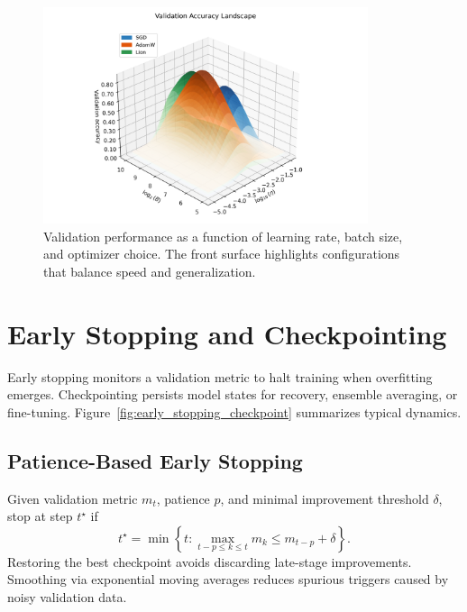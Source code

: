 \documentclass{article}
\begin{document}
\begin{figure}[H]
  \centering
  \includegraphics[width=0.85\textwidth]{hyperparameter_landscape.png}
  \caption{Validation performance as a function of learning rate, batch size, and optimizer choice. The front surface highlights configurations that balance speed and generalization.}
  \label{fig:hyperparameter_landscape}
\end{figure}
\FloatBarrier

\section{Early Stopping and Checkpointing}
Early stopping monitors a validation metric to halt training when overfitting emerges. Checkpointing persists model states for recovery, ensemble averaging, or fine-tuning. Figure~\ref{fig:early_stopping_checkpoint} summarizes typical dynamics.

\subsection{Patience-Based Early Stopping}
Given validation metric $m_t$, patience $p$, and minimal improvement threshold $\delta$, stop at step $t^\star$ if
\begin{equation}
  t^\star = \min \left\{ t : \max_{t - p \le k \le t} m_k \le m_{t-p} + \delta \right\}.
\end{equation}
Restoring the best checkpoint avoids discarding late-stage improvements. Smoothing via exponential moving averages reduces spurious triggers caused by noisy validation data.
\end{document}
